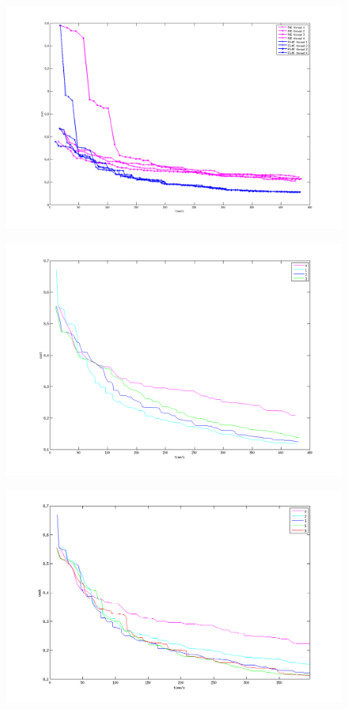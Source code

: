 \begin{figure}[tb]
  \includegraphics[width=\columnwidth]{figure/optical_flow_by_threads.png}
  \caption{}\label{fig:optical_flow_by_threads}
\end{figure}
\begin{figure}[tb]
  \includegraphics[width=\columnwidth]{figure/optical_flow_by_beta.png}
  \caption{}\label{fig:optical_flow_by_beta}
\end{figure}
\begin{figure}[tb]
  \includegraphics[width=\columnwidth]{figure/optical_flow_by_interval.png}
  \caption{}\label{fig:optical_flow_by_interval}
\end{figure}



